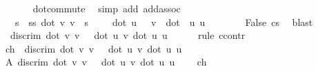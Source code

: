 \begin{isabellebody}
\ \ \ \ \isamarkupfalse%
\ {}\ dot{\isacharunderscore}{\kern0pt}commute\ \isamarkupfalse%
\ {\isacharparenleft}{\kern0pt}simp\ add{\isacharcolon}{\kern0pt}\ add{\isachardot}{\kern0pt}assoc{\isacharparenright}{\kern0pt}\isanewline
\ \ \isamarkupfalse%
\ {}{\isacharcolon}{\kern0pt}\ {\isachardoublequoteopen}{\isasymforall}\ s\ {\isachardot}{\kern0pt}\ s{\isacharasterisk}{\kern0pt}s{\isacharasterisk}{\kern0pt}\ dot\ v\ v\ {\isacharplus}{\kern0pt}\ s\ {\isacharasterisk}{\kern0pt}\ {}\ {\isacharasterisk}{\kern0pt}\ \ {\isacharparenleft}{\kern0pt}dot\ u\ \ \ v{\isacharparenright}{\kern0pt}\ {\isacharplus}{\kern0pt}\ {\isacharparenleft}{\kern0pt}dot\ \ u\ u{\isacharparenright}{\kern0pt}\ {\isasymge}\ {}{\isachardoublequoteclose}\ \isamarkupfalse%
\ {}\ \ \isamarkupfalse%
\ False\ cs{}\ \isamarkupfalse%
\ blast\isanewline
\isanewline
\ \ \isamarkupfalse%
\ {}{\isacharcolon}{\kern0pt}\ {\isachardoublequoteopen}discrim\ {\isacharparenleft}{\kern0pt}dot\ v\ v{\isacharparenright}{\kern0pt}\ {\isacharparenleft}{\kern0pt}{}\ {\isacharasterisk}{\kern0pt}\ dot\ u\ v{\isacharparenright}{\kern0pt}\ {\isacharparenleft}{\kern0pt}dot\ u\ u{\isacharparenright}{\kern0pt}\ {\isasymle}\ {}{\isachardoublequoteclose}\isanewline
\ \ \isamarkupfalse%
\ {\isacharparenleft}{\kern0pt}rule\ ccontr{\isacharparenright}{\kern0pt}\isanewline
\ \ \ \ \isamarkupfalse%
\ ch{\isacharcolon}{\kern0pt}\ {\isachardoublequoteopen}{\isasymnot}\ {\isacharparenleft}{\kern0pt}discrim\ {\isacharparenleft}{\kern0pt}dot\ v\ v{\isacharparenright}{\kern0pt}\ {\isacharparenleft}{\kern0pt}{}\ {\isacharasterisk}{\kern0pt}\ dot\ u\ v{\isacharparenright}{\kern0pt}\ {\isacharparenleft}{\kern0pt}dot\ u\ u{\isacharparenright}{\kern0pt}\ {\isasymle}\ {}{\isacharparenright}{\kern0pt}{\isachardoublequoteclose}\isanewline
\ \ \ \ \isamarkupfalse%
\ A{\isacharcolon}{\kern0pt}\ {\isachardoublequoteopen}discrim\ {\isacharparenleft}{\kern0pt}dot\ v\ v{\isacharparenright}{\kern0pt}\ {\isacharparenleft}{\kern0pt}{}\ {\isacharasterisk}{\kern0pt}\ dot\ u\ v{\isacharparenright}{\kern0pt}\ {\isacharparenleft}{\kern0pt}dot\ u\ u{\isacharparenright}{\kern0pt}\ {\isachargreater}{\kern0pt}\ {}{\isachardoublequoteclose}\ \isamarkupfalse%
\ ch\ \isamarkupfalse%

\end{isabellebody}
